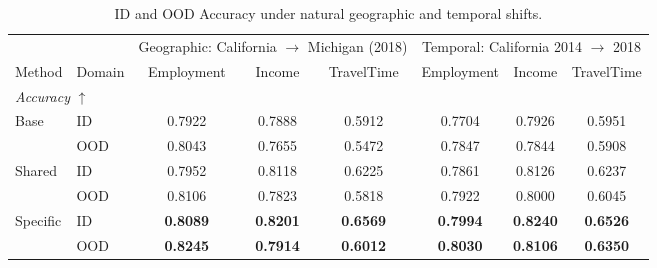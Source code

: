 
\begin{table}[H]
  \centering
  \caption{ID and OOD Accuracy under natural geographic and temporal shifts.}
  \label{tab:natural-shifts}
  \small
  \setlength{\tabcolsep}{4.4pt}
  \renewcommand{\arraystretch}{1.02}
  \begin{tabular}{llcccccc}
    \toprule
    & & \multicolumn{3}{c}{Geographic: California $\rightarrow$ Michigan (2018)}
      & \multicolumn{3}{c}{Temporal: California 2014 $\rightarrow$ 2018} \\
    \cmidrule(lr){3-5}\cmidrule(lr){6-8}
    Method & Domain & Employment & Income & TravelTime
      & Employment & Income & TravelTime \\
    \midrule
    \multicolumn{8}{l}{\textit{Accuracy} $\uparrow$} \\
    Base & ID
      & 0.7922 & 0.7888 & 0.5912 & 0.7704 & 0.7926 & 0.5951 \\
         & OOD
      & 0.8043 & 0.7655 & 0.5472 & 0.7847 & 0.7844 & 0.5908 \\
    Shared & ID
      & \textcolor{revisionblue}{0.7952} & \textcolor{revisionblue}{0.8118} & \textcolor{revisionblue}{0.6225}
      & \textcolor{revisionblue}{0.7861} & \textcolor{revisionblue}{0.8126} & \textcolor{revisionblue}{0.6237} \\
         & OOD
      & \textcolor{revisionblue}{0.8106} & \textcolor{revisionblue}{0.7823} & \textcolor{revisionblue}{0.5818}
      & \textcolor{revisionblue}{0.7922} & \textcolor{revisionblue}{0.8000} & \textcolor{revisionblue}{0.6045} \\
    Specific & ID
      & \textcolor{revisionblue}{\textbf{0.8089}} & \textcolor{revisionblue}{\textbf{0.8201}} & \textcolor{revisionblue}{\textbf{0.6569}}
      & \textcolor{revisionblue}{\textbf{0.7994}} & \textcolor{revisionblue}{\textbf{0.8240}} & \textcolor{revisionblue}{\textbf{0.6526}} \\
         & OOD
      & \textcolor{revisionblue}{\textbf{0.8245}} & \textcolor{revisionblue}{\textbf{0.7914}} & \textcolor{revisionblue}{\textbf{0.6012}}
      & \textcolor{revisionblue}{\textbf{0.8030}} & \textcolor{revisionblue}{\textbf{0.8106}} & \textcolor{revisionblue}{\textbf{0.6350}} \\
    \bottomrule
  \end{tabular}
\end{table}

